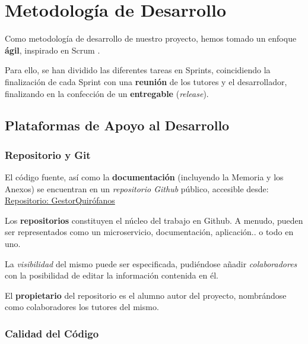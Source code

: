 
\section{Metodología de Desarrollo}

Como metodología de desarrollo de nuestro proyecto, hemos tomado un enfoque \textbf{ágil}, inspirado en Scrum \cite{Palacio2022ScrumMaster}.

Para ello, se han dividido las diferentes tareas en Sprints, coincidiendo la finalización de cada Sprint con una \textbf{reunión} de los tutores y el desarrollador, finalizando en la confección de un \textbf{entregable} (\textit{release}).


\subsection{Plataformas de Apoyo al Desarrollo}

\subsubsection{Repositorio y Git}

El código fuente, así como la \textbf{documentación} (incluyendo la Memoria y los Anexos) se encuentran en un \textit{repositorio Github} público, accesible desde: \href{https://github.com/jesgararm/GestorQuirofanos}{Repositorio: GestorQuirófanos}

Los \textbf{repositorios} constituyen el núcleo del trabajo en Github. A menudo, pueden ser representados como un microservicio, documentación, aplicación.. o todo en uno. 

La \textit{visibilidad} del mismo puede ser especificada, pudiéndose añadir \textit{colaboradores} con la posibilidad de editar la información contenida en él.

El \textbf{propietario} del repositorio es el alumno autor del proyecto, nombrándose como colaboradores los tutores del mismo.



\subsubsection{Calidad del Código}

